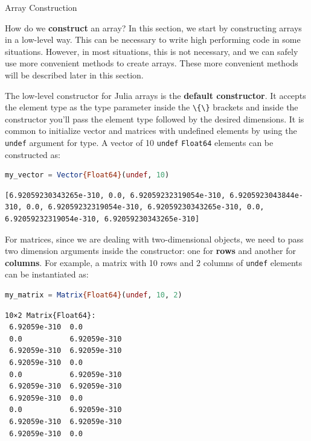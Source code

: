 \documentclass[
  notoc %
]{tufte-book}
\makeatletter
\newcommand{\passthrough}[1]{#1}
\renewcommand\subsubsection{%
\@startsection{subsubsection}{3}{\z@ }{-3.25ex\@plus -1ex \@minus -.2ex}{1.5ex \@plus .2ex}{\normalfont \normalsize \bfseries }
}
\makeatother
\begin{document}
\hypertarget{sec:array_construction}{%
\subsubsection{Array Construction}\label{sec:array_construction}}

How do we \textbf{construct} an array? In this section, we start by
constructing arrays in a low-level way. This can be necessary to write
high performing code in some situations. However, in most situations,
this is not necessary, and we can safely use more convenient methods to
create arrays. These more convenient methods will be described later in
this section.

The low-level constructor for Julia arrays is the \textbf{default
constructor}. It accepts the element type as the type parameter inside
the \passthrough{\lstinline!\{\}!} brackets and inside the constructor
you'll pass the element type followed by the desired dimensions. It is
common to initialize vector and matrices with undefined elements by
using the \passthrough{\lstinline!undef!} argument for type. A vector of
10 \passthrough{\lstinline!undef!} \passthrough{\lstinline!Float64!}
elements can be constructed as:

\begin{lstlisting}[language=Julia]
my_vector = Vector{Float64}(undef, 10)
\end{lstlisting}

\begin{lstlisting}[language=Output]
[6.92059230343265e-310, 0.0, 6.92059232319054e-310, 6.9205923043844e-310, 0.0, 6.92059232319054e-310, 6.92059230343265e-310, 0.0, 6.92059232319054e-310, 6.92059230343265e-310]
\end{lstlisting}

For matrices, since we are dealing with two-dimensional objects, we need
to pass two dimension arguments inside the constructor: one for
\textbf{rows} and another for \textbf{columns}. For example, a matrix
with 10 rows and 2 columns of \passthrough{\lstinline!undef!} elements
can be instantiated as:

\begin{lstlisting}[language=Julia]
my_matrix = Matrix{Float64}(undef, 10, 2)
\end{lstlisting}

\begin{lstlisting}[language=Output]
10×2 Matrix{Float64}:
 6.92059e-310  0.0
 0.0           6.92059e-310
 6.92059e-310  6.92059e-310
 6.92059e-310  0.0
 0.0           6.92059e-310
 6.92059e-310  6.92059e-310
 6.92059e-310  0.0
 0.0           6.92059e-310
 6.92059e-310  6.92059e-310
 6.92059e-310  0.0
\end{lstlisting}
\end{document}
